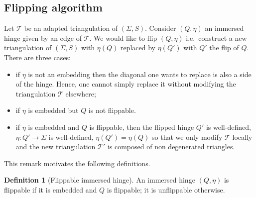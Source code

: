 \documentclass[a4paper,12pt]{article}
\def\TT{\mathcal T}
\theoremstyle{definition}
\newtheorem{defi}[lem]{Definition}	%
\begin{document}
					\subsection{Flipping algorithm}
										
						Let $\TT$ be an adapted triangulation of $(\Sigma, S)$. Consider $(Q,\eta)$ an immersed hinge given by an edge of $\TT$.
						We would like to flip $(Q,\eta)$ i.e.\ construct a new triangulation of $(\Sigma, S)$ with $\eta(Q)$ replaced by $\eta(Q')$ with $Q'$ the flip of $Q$.
 						There are three cases: 
						\begin{itemize}
						 \item if $\eta$ is not an embedding then the diagonal one wants to replace is also a side of the hinge. Hence, one cannot simply replace it without modifying the triangulation $\TT$ elsewhere;
						 \item if $\eta$ is embedded but $Q$ is not flippable.

						 \item if $\eta$ is embedded and $Q$ is flippable, then the flipped hinge $Q'$ is well-defined, $\eta: Q' \rightarrow \Sigma$ is well-defined, $\eta(Q')= \eta(Q)$ so that we only modify $\TT$ locally and the new triangulation $\TT'$ is composed of non degenerated triangles.
						\end{itemize}
					
						
						This remark motivates the following definitions.
						

						\begin{defi}[Flippable immersed hinge]\label{defi:immersed_hinge_flippable}
						An immersed hinge $(Q,\eta)$ is flippable if it is embedded and $Q$ is flippable; it is unflippable otherwise.
						\end{defi}
\end{document}
